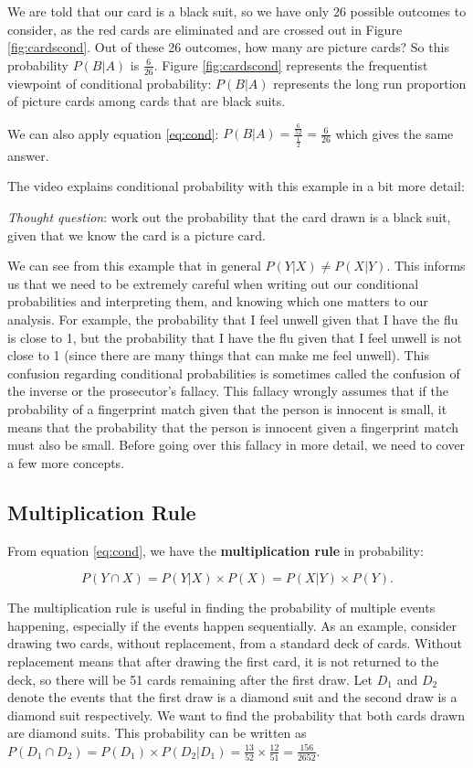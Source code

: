 \documentclass[
]{book}
\begin{document}
We are told that our card is a black suit, so we have only 26 possible outcomes to consider, as the red cards are eliminated and are crossed out in Figure \ref{fig:cardscond}. Out of these 26 outcomes, how many are picture cards? So this probability \(P(B|A)\) is \(\frac{6}{26}\). Figure \ref{fig:cardscond} represents the frequentist viewpoint of conditional probability: \(P(B|A)\) represents the long run proportion of picture cards among cards that are black suits.

We can also apply equation \eqref{eq:cond}: \(P(B|A) = \frac{\frac{6}{52}}{\frac{1}{2}} = \frac{6}{26}\) which gives the same answer.

The video explains conditional probability with this example in a bit more detail:

\emph{Thought question}: work out the probability that the card drawn is a black suit, given that we know the card is a picture card.

We can see from this example that in general \(P(Y|X) \neq P(X|Y)\). This informs us that we need to be extremely careful when writing out our conditional probabilities and interpreting them, and knowing which one matters to our analysis. For example, the probability that I feel unwell given that I have the flu is close to 1, but the probability that I have the flu given that I feel unwell is not close to 1 (since there are many things that can make me feel unwell). This confusion regarding conditional probabilities is sometimes called the confusion of the inverse or the prosecutor's fallacy. This fallacy wrongly assumes that if the probability of a fingerprint match given that the person is innocent is small, it means that the probability that the person is innocent given a fingerprint match must also be small. Before going over this fallacy in more detail, we need to cover a few more concepts.

\hypertarget{multiplication-rule}{%
\subsection{Multiplication Rule}\label{multiplication-rule}}

From equation \eqref{eq:cond}, we have the \textbf{multiplication rule} in probability:

\begin{equation} 
P(Y \cap X) = P(Y|X) \times P(X) = P(X|Y) \times P(Y).
\label{eq:mult}
\end{equation}

The multiplication rule is useful in finding the probability of multiple events happening, especially if the events happen sequentially. As an example, consider drawing two cards, without replacement, from a standard deck of cards. Without replacement means that after drawing the first card, it is not returned to the deck, so there will be 51 cards remaining after the first draw. Let \(D_1\) and \(D_2\) denote the events that the first draw is a diamond suit and the second draw is a diamond suit respectively. We want to find the probability that both cards drawn are diamond suits. This probability can be written as \(P(D_1 \cap D_2) = P(D_1) \times P(D_2|D_1) = \frac{13}{52} \times \frac{12}{51} = \frac{156}{2652}\).
\end{document}
